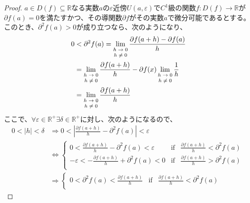 \documentclass[dvipdfmx]{jsarticle}
\begin{document}
\begin{proof}
$a \in D(f) \subseteq \mathbb{R}$なる実数$a$の$\varepsilon$近傍$U(a,\varepsilon)$で$C^{1}$級の関数$f:D(f) \rightarrow \mathbb{R}$が$\partial f(a) = 0$を満たすかつ、その導関数$\partial f$がその実数$a$で微分可能であるとする。このとき、$\partial^{2}f(a) > 0$が成り立つなら、次のようになり、
\begin{align*}
0 &< \partial^{2}f(a) = \lim_{\scriptsize \begin{matrix}
h \rightarrow 0 \\
h \neq 0 \\
\end{matrix}}\frac{\partial f(a + h) - \partial f(a)}{h}\\
&= \lim_{\scriptsize \begin{matrix}
h \rightarrow 0 \\
h \neq 0 \\
\end{matrix}}\frac{\partial f(a + h)}{h} - \partial f(x)\lim_{\scriptsize \begin{matrix}
h \rightarrow 0 \\
h \neq 0 \\
\end{matrix}}\frac{1}{h}\\
&= \lim_{\scriptsize \begin{matrix}
h \rightarrow 0 \\
h \neq 0 \\
\end{matrix}}\frac{\partial f(a + h)}{h}
\end{align*}
ここで、$\forall\varepsilon \in \mathbb{R}^{+}\exists\delta \in \mathbb{R}^{+}$に対し、次のようになるので、
\begin{align*}
0 < |h| < \delta &\Rightarrow 0 < \left| \frac{\partial f(a + h)}{h} - \partial^{2}f(a) \right| < \varepsilon\\
&\Leftrightarrow \left\{ \begin{matrix}
0 < \frac{\partial f(a + h)}{h} - \partial^{2}f(a) < \varepsilon & \mathrm{if} & \frac{\partial f(a + h)}{h} < \partial^{2}f(a) \\
 - \varepsilon < - \frac{\partial f(a + h)}{h} + \partial^{2}f(a) < 0 & \mathrm{if} & \frac{\partial f(a + h)}{h} > \partial^{2}f(a) \\
\end{matrix} \right.\ \\
&\Rightarrow \left\{ \begin{matrix}
0 < \partial^{2}f(a) < \frac{\partial f(a + h)}{h} & \mathrm{if} & \frac{\partial f(a + h)}{h} < \partial^{2}f(a) \\

\end{matrix}
\end{align*}
\end{proof}
\end{document}
